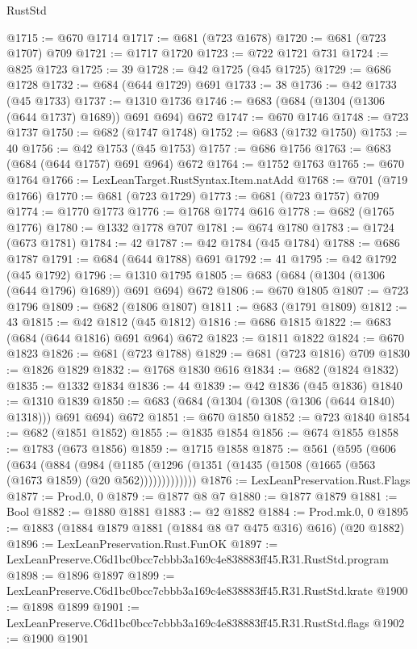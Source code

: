 \begin{lexlean}{RustStd}
\begin{coremodule}
@1715 := @670 @1714
@1717 := @681 (@723 @1678)
@1720 := @681 (@723 @1707) @709
@1721 := @1717 @1720
@1723 := @722 @1721 @731
@1724 := @825 @1723
@1725 := 39
@1728 := @42 @1725 (@45 @1725)
@1729 := @686 @1728
@1732 := @684 (@644 @1729) @691
@1733 := 38
@1736 := @42 @1733 (@45 @1733)
@1737 := @1310 @1736
@1746 := @683 (@684 (@1304 (@1306 (@644 @1737) @1689)) @691 @694) @672
@1747 := @670 @1746
@1748 := @723 @1737
@1750 := @682 (@1747 @1748)
@1752 := @683 (@1732 @1750)
@1753 := 40
@1756 := @42 @1753 (@45 @1753)
@1757 := @686 @1756
@1763 := @683 (@684 (@644 @1757) @691 @964) @672
@1764 := @1752 @1763
@1765 := @670 @1764
@1766 := LexLeanTarget.RustSyntax.Item.natAdd
@1768 := @701 (@719 @1766)
@1770 := @681 (@723 @1729)
@1773 := @681 (@723 @1757) @709
@1774 := @1770 @1773
@1776 := @1768 @1774 @616
@1778 := @682 (@1765 @1776)
@1780 := @1332 @1778 @707
@1781 := @674 @1780
@1783 := @1724 (@673 @1781)
@1784 := 42
@1787 := @42 @1784 (@45 @1784)
@1788 := @686 @1787
@1791 := @684 (@644 @1788) @691
@1792 := 41
@1795 := @42 @1792 (@45 @1792)
@1796 := @1310 @1795
@1805 := @683 (@684 (@1304 (@1306 (@644 @1796) @1689)) @691 @694) @672
@1806 := @670 @1805
@1807 := @723 @1796
@1809 := @682 (@1806 @1807)
@1811 := @683 (@1791 @1809)
@1812 := 43
@1815 := @42 @1812 (@45 @1812)
@1816 := @686 @1815
@1822 := @683 (@684 (@644 @1816) @691 @964) @672
@1823 := @1811 @1822
@1824 := @670 @1823
@1826 := @681 (@723 @1788)
@1829 := @681 (@723 @1816) @709
@1830 := @1826 @1829
@1832 := @1768 @1830 @616
@1834 := @682 (@1824 @1832)
@1835 := @1332 @1834
@1836 := 44
@1839 := @42 @1836 (@45 @1836)
@1840 := @1310 @1839
@1850 := @683 (@684 (@1304 (@1308 (@1306 (@644 @1840) @1318))) @691 @694) @672
@1851 := @670 @1850
@1852 := @723 @1840
@1854 := @682 (@1851 @1852)
@1855 := @1835 @1854
@1856 := @674 @1855
@1858 := @1783 (@673 @1856)
@1859 := @1715 @1858
@1875 := @561
    (@595
      (@606
        (@634
          (@884
            (@984
              (@1185 (@1296 (@1351 (@1435 (@1508 (@1665 (@563 (@1673 @1859) (@20 @562)))))))))))))
@1876 := LexLeanPreservation.Rust.Flags
@1877 := Prod.{0, 0}
@1879 := @1877 @8 @7
@1880 := @1877 @1879
@1881 := Bool
@1882 := @1880 @1881
@1883 := @2 @1882
@1884 := Prod.mk.{0, 0}
@1895 := @1883 (@1884 @1879 @1881 (@1884 @8 @7 @475 @316) @616) (@20 @1882)
@1896 := LexLeanPreservation.Rust.FunOK
@1897 := LexLeanPreserve.C6d1bc0bcc7cbbb3a169c4e838883ff45.R31.RustStd.program
@1898 := @1896 @1897
@1899 := LexLeanPreserve.C6d1bc0bcc7cbbb3a169c4e838883ff45.R31.RustStd.krate
@1900 := @1898 @1899
@1901 := LexLeanPreserve.C6d1bc0bcc7cbbb3a169c4e838883ff45.R31.RustStd.flags
@1902 := @1900 @1901

\end{coremodule}
\end{lexlean}
